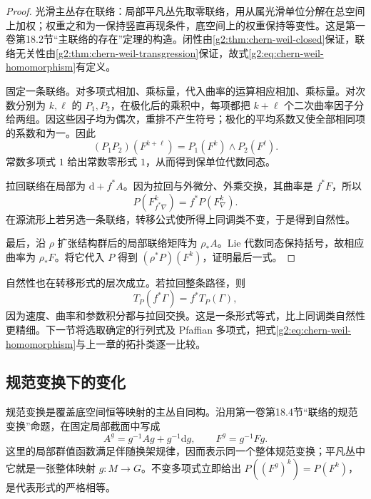 \begin{proof}
	光滑主丛存在联络：局部平凡丛先取零联络，用从属光滑单位分解在总空间上加权；权重之和为一保持竖直再现条件，底空间上的权重保持等变性。这是第一卷第18.2节“主联络的存在”定理的构造。闭性由\cref{g2:thm:chern-weil-closed}保证，联络无关性由\cref{g2:thm:chern-weil-transgression}保证，故式\eqref{g2:eq:chern-weil-homomorphism}有定义。

	固定一条联络。对多项式相加、乘标量，代入曲率的运算相应相加、乘标量。对次数分别为 \(k,\ell\) 的 \(P_1,P_2\)，在极化后的乘积中，每项都把 \(k+\ell\) 个二次曲率因子分给两组。因这些因子均为偶次，重排不产生符号；极化的平均系数又使全部相同项的系数和为一。因此
	\[
		(P_1P_2)(F^{k+\ell})=P_1(F^k)\wedge P_2(F^\ell).
	\]
	常数多项式 \(1\) 给出常数零形式 \(1\)，从而得到保单位代数同态。

	拉回联络在局部为 \(\mathrm d+f^*A\)。因为拉回与外微分、外乘交换，其曲率是 \(f^*F\)，所以
	\[
		P(F_{f^*\nabla}^k)=f^*P(F_\nabla^k).
	\]
	在源流形上若另选一条联络，转移公式使所得上同调类不变，于是得到自然性。

	最后，沿 \(\rho\) 扩张结构群后的局部联络矩阵为 \(\rho_*A\)。Lie 代数同态保持括号，故相应曲率为 \(\rho_*F\)。将它代入 \(P\) 得到 \((\rho^*P)(F^k)\)，证明最后一式。
\end{proof}

自然性也在转移形式的层次成立。若拉回整条路径，则
\begin{equation}\label{g2:eq:transgression-pullback}
	T_P(f^*\Gamma)=f^*T_P(\Gamma),
\end{equation}
因为速度、曲率和参数积分都与拉回交换。这是一条形式等式，比上同调类自然性更精细。下一节将选取确定的行列式及 Pfaffian 多项式，把式\eqref{g2:eq:chern-weil-homomorphism}与上一章的拓扑类逐一比较。

\subsection{规范变换下的变化}
\label{g2:subsec:2202:04}
规范变换是覆盖底空间恒等映射的主丛自同构。沿用第一卷第18.4节“联络的规范变换”命题，在固定局部截面中写成
\[
	A^g=g^{-1}Ag+g^{-1}\mathrm dg,\qquad F^g=g^{-1}Fg.
\]
这里的局部群值函数满足伴随换架规律，因而表示同一个整体规范变换；平凡丛中它就是一张整体映射 \(g:M\to G\)。不变多项式立即给出 \(P((F^g)^k)=P(F^k)\)，是代表形式的严格相等。

